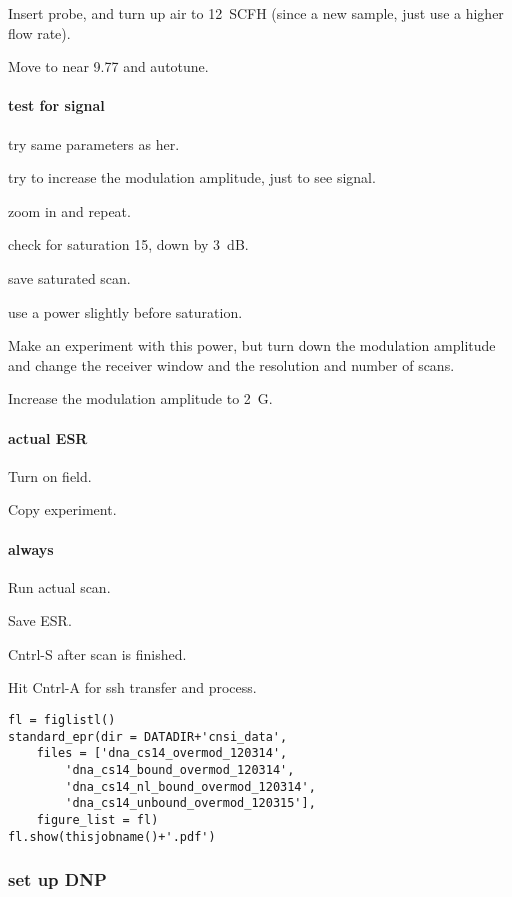 Insert probe, and turn up air to 12~SCFH (since a new sample, just use a higher flow rate).

Move to near 9.77 and autotune.

\paragraph{test for signal}
try same parameters as her.

try to increase the modulation amplitude, just to see signal.

zoom in and repeat.

check for saturation 15, down by 3~dB.

save saturated scan.

use a power slightly before saturation.

Make an experiment with this power, but turn down the modulation amplitude and change the receiver window and the resolution and number of scans.

Increase the modulation amplitude to 2~G.

\paragraph{actual ESR}
Turn on field.

Copy experiment.

\paragraph{always}
Run actual scan.

Save ESR.

Cntrl-S after scan is finished.

Hit Cntrl-A for ssh transfer and process.

\begin{tiny}
\begin{lstlisting}
fl = figlistl()
standard_epr(dir = DATADIR+'cnsi_data',
    files = ['dna_cs14_overmod_120314',
        'dna_cs14_bound_overmod_120314',
        'dna_cs14_nl_bound_overmod_120314',
        'dna_cs14_unbound_overmod_120315'],
    figure_list = fl)
fl.show(thisjobname()+'.pdf')
\end{lstlisting}
\end{tiny}

\subsubsection{set up DNP}

